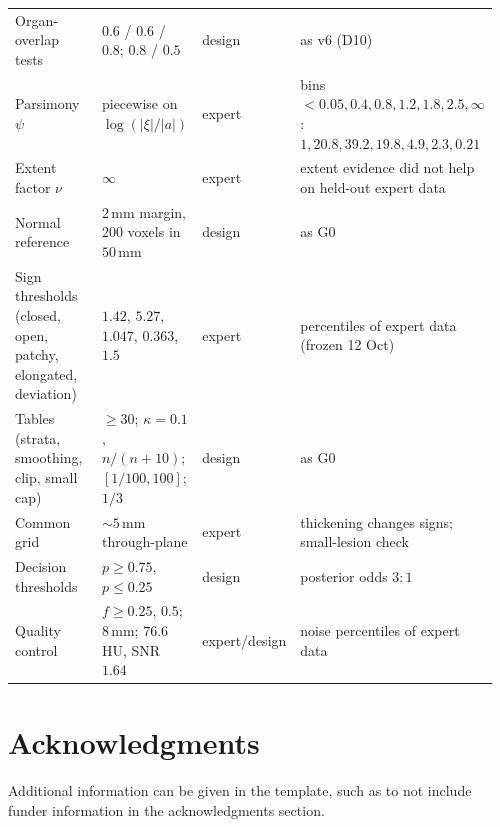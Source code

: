 \documentclass[fleqn,10pt]{olplainarticle}
\begin{document}
\begin{table}[t]
\begin{tabular}{p{0.30\linewidth}p{0.20\linewidth}p{0.10\linewidth}p{0.36\linewidth}}
Organ-overlap tests & $0.6$ / $0.6$ / $0.8$; $0.8$ / $0.5$ & design & as v6 (D10)\\
Parsimony $\psi$ & piecewise on $\log(|\xi|/|a|)$ & expert & bins $<0.05,0.4,0.8,1.2,1.8,2.5,\infty$: $1, 20.8, 39.2, 19.8, 4.9, 2.3, 0.21$\\
Extent factor $\nu$ & $\infty$ & expert & extent evidence did not help on held-out expert data\\
Normal reference & $2$\,mm margin, $200$ voxels in $50$\,mm & design & as G0\\
Sign thresholds (closed, open, patchy, elongated, deviation) & $1.42$, $5.27$, $1.047$, $0.363$, $1.5$ & expert & percentiles of expert data (frozen 12 Oct)\\
Tables (strata, smoothing, clip, small cap) & $\ge30$; $\kappa=0.1$, $n/(n+10)$; $[1/100,100]$; $1/3$ & design & as G0\\
Common grid & $\sim5$\,mm through-plane & expert & thickening changes signs; small-lesion check\\
Decision thresholds & $p\ge0.75$, $p\le0.25$ & design & posterior odds $3{:}1$\\
Quality control & $f\ge0.25$, $0.5$; $8$\,mm; $76.6$\,HU, SNR $1.64$ & expert/design & noise percentiles of expert data\\
\hline
\end{tabular}
\end{table}

\section*{Acknowledgments}

Additional information can be given in the template, such as to not include funder information in the acknowledgments section.


\end{document}
